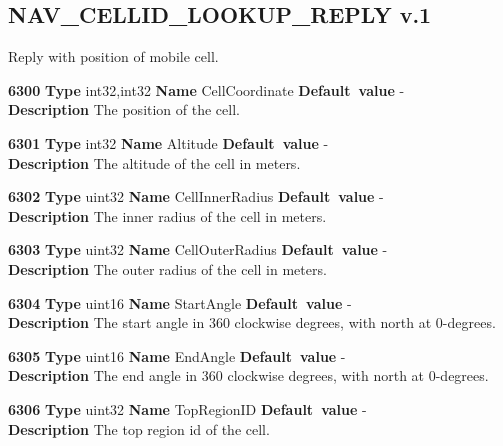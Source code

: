 \documentclass[a4paper]{article}
\begin{document}
\subsection{NAV\_CELLID\_LOOKUP\_REPLY v.1}

Reply with position of mobile cell. 

\begin{list}{\textbf{ParamID}}{}
\item \textbf{6300} \textbf{Type} int32,int32 \textbf{Name} CellCoordinate
                 \textbf{Default~value} - \\
  \textbf{Description} The position of the cell.
\item \textbf{6301} \textbf{Type} int32 \textbf{Name} Altitude
                 \textbf{Default~value} - \\
  \textbf{Description} The altitude of the cell in meters.
\item \textbf{6302} \textbf{Type} uint32 \textbf{Name} CellInnerRadius
                 \textbf{Default~value} - \\
  \textbf{Description} The inner radius of the cell in meters.
\item \textbf{6303} \textbf{Type} uint32 \textbf{Name} CellOuterRadius
                 \textbf{Default~value} - \\
  \textbf{Description} The outer radius of the cell in meters.
\item \textbf{6304} \textbf{Type} uint16 \textbf{Name} StartAngle
                 \textbf{Default~value} - \\
  \textbf{Description} The start angle in 360 clockwise degrees, 
  with north at 0-degrees.
\item \textbf{6305} \textbf{Type} uint16 \textbf{Name} EndAngle
                 \textbf{Default~value} - \\
  \textbf{Description} The end angle in 360 clockwise degrees, 
  with north at 0-degrees.
\item \textbf{6306} \textbf{Type} uint32 \textbf{Name} TopRegionID
                 \textbf{Default~value} - \\
  \textbf{Description} The top region id of the cell.
\end{list}
\end{document}
